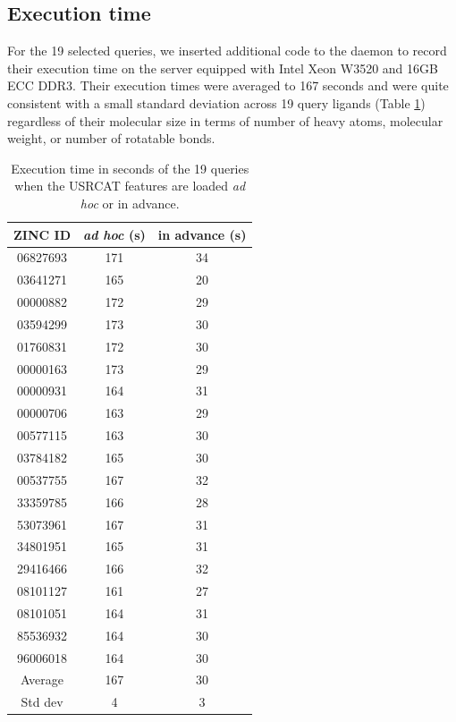 \subsection{Execution time}

For the 19 selected queries, we inserted additional code to the daemon to record their execution time on the server equipped with Intel Xeon W3520 and 16GB ECC DDR3. Their execution times were averaged to 167 seconds and were quite consistent with a small standard deviation across 19 query ligands (Table \ref{usr:ExecutionTime}) regardless of their molecular size in terms of number of heavy atoms, molecular weight, or number of rotatable bonds.

\begin{table}
\caption{Execution time in seconds of the 19 queries when the USRCAT features are loaded \textit{ad hoc} or in advance.}
\label{usr:ExecutionTime}
\begin{tabular}{ccc}
\hline
ZINC ID  & \textit{ad hoc} (s) & in advance (s)\\
\hline
06827693 & 171 & 34\\
03641271 & 165 & 20\\
00000882 & 172 & 29\\
03594299 & 173 & 30\\
01760831 & 172 & 30\\
00000163 & 173 & 29\\
00000931 & 164 & 31\\
00000706 & 163 & 29\\
00577115 & 163 & 30\\
03784182 & 165 & 30\\
00537755 & 167 & 32\\
33359785 & 166 & 28\\
53073961 & 167 & 31\\
34801951 & 165 & 31\\
29416466 & 166 & 32\\
08101127 & 161 & 27\\
08101051 & 164 & 31\\
85536932 & 164 & 30\\
96006018 & 164 & 30\\
\hline
 Average & 167 & 30\\
 Std dev &   4 &  3\\
\hline
\end{tabular}
\end{table}

